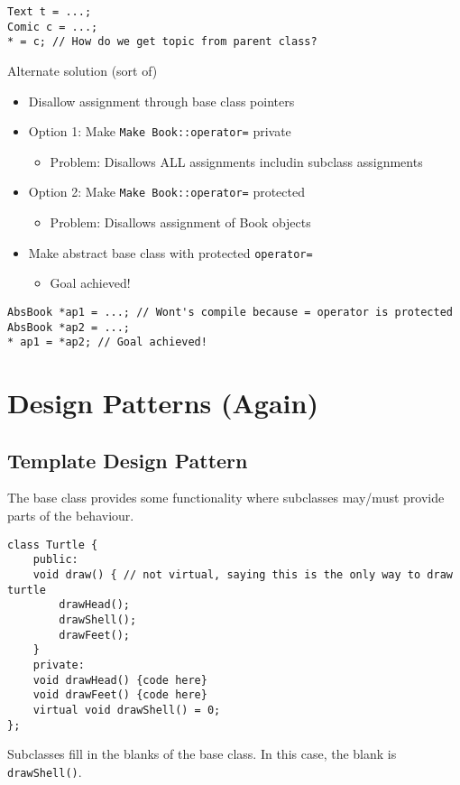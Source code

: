 \documentclass[12pt]{article}
\begin{document}
\begin{lstlisting}
Text t = ...;
Comic c = ...;
* = c; // How do we get topic from parent class?
\end{lstlisting}
Alternate solution (sort of)
\begin{itemize}
    \item Disallow assignment through base class pointers
    \item Option 1: Make \lstinline{Make Book::operator=} private
    \begin{itemize}
        \item Problem: Disallows ALL assignments includin subclass assignments
    \end{itemize}
    \item Option 2: Make \lstinline{Make Book::operator=} protected
    \begin{itemize}
        \item Problem: Disallows assignment of Book objects
    \end{itemize}
    \item Make abstract base class with protected \lstinline{operator=}
    \begin{itemize}
        \item Goal achieved!
    \end{itemize}
\end{itemize}
\begin{lstlisting}
AbsBook *ap1 = ...; // Wont's compile because = operator is protected
AbsBook *ap2 = ...;
* ap1 = *ap2; // Goal achieved!
\end{lstlisting}

\section{Design Patterns (Again)}

\subsection{Template Design Pattern}
The base class provides some functionality where subclasses may/must provide parts of the behaviour.

\begin{lstlisting}
class Turtle {
    public:
    void draw() { // not virtual, saying this is the only way to draw turtle
        drawHead();
        drawShell();
        drawFeet();
    }
    private:
    void drawHead() {code here}
    void drawFeet() {code here}
    virtual void drawShell() = 0;
};
\end{lstlisting}
Subclasses fill in the blanks of the base class. In this case, the blank is \lstinline{drawShell()}.
\end{document}
